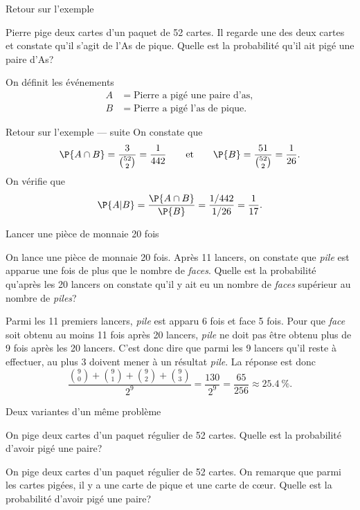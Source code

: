 \documentclass[nuit,charter,pied]{BeamerJS}
\begin{document}
\begin{frame}{Retour sur l'exemple}
\pause
	\begin{ex}
	Pierre pige deux cartes d'un paquet de 52 cartes. Il regarde une des deux cartes et constate qu'il s'agit de l'As de pique. Quelle est la probabilité qu'il ait pigé une paire d'As?
	\end{ex}
	\pause
	On définit les événements
	\begin{align*} 
		A&= \text{Pierre a pigé une paire d'as},\\
		B&= \text{Pierre a pigé l'as de pique}.
	\end{align*}
\end{frame}
\begin{frame}{Retour sur l'exemple --- suite}
	On constate que \[\P{A\cap B}=\frac{3}{\binom{52}{2}}=\frac{1}{442}\qquad\text{et}\qquad\P{B}=\frac{51}{\binom{52}{2}}=\frac{1}{26}.\]\pause
	On vérifie que
	\[\P{A|B}=\frac{\P{A\cap B}}{\P{B}}=\frac{1/442}{1/26}=\frac{1}{17}.\]
\end{frame}
\begin{frame}{Lancer une pièce de monnaie 20 fois}
\pause
	\begin{ex}
	On lance une pièce de monnaie 20 fois. Après 11 lancers, on constate que \emph{pile} est apparue une fois de plus que le nombre de \emph{faces}. Quelle est la probabilité qu'après les 20 lancers on constate qu'il y ait eu un nombre de \emph{faces} supérieur au nombre de \emph{piles}?
	\end{ex}
    \pause
    Parmi les 11 premiers lancers, \textit{pile} est apparu 6 fois et face 5 fois. \pause Pour que \textit{face} soit obtenu au moins 11 fois après 20 lancers, \textit{pile} ne doit pas être obtenu plus de 9 fois après les 20 lancers. \pause C'est donc dire que parmi les 9 lancers qu'il reste à effectuer, au plus 3 doivent mener à un résultat \textit{pile}. \pause La réponse est donc
    \[
    	\frac{\binom{9}{0}+\binom{9}{1}+\binom{9}{2}+\binom{9}{3}}{2^9}=\frac{130}{2^9}=\frac{65}{256}\approx \SI{25,4}{\percent}.
    \]
\end{frame}
\begin{frame}[t]{Deux variantes d'un même problème}
\pause
	\begin{ex}
		On pige deux cartes d'un paquet régulier de 52 cartes. Quelle est la probabilité d'avoir pigé une paire?
	\end{ex}
\pause
	\vfill
	\begin{ex}
		On pige deux cartes d'un paquet régulier de 52 cartes. On remarque que parmi les cartes pigées, il y a une carte de pique et une carte de c\oe ur. Quelle est la probabilité d'avoir pigé une paire?
	\end{ex}
\end{frame}
\end{document}
